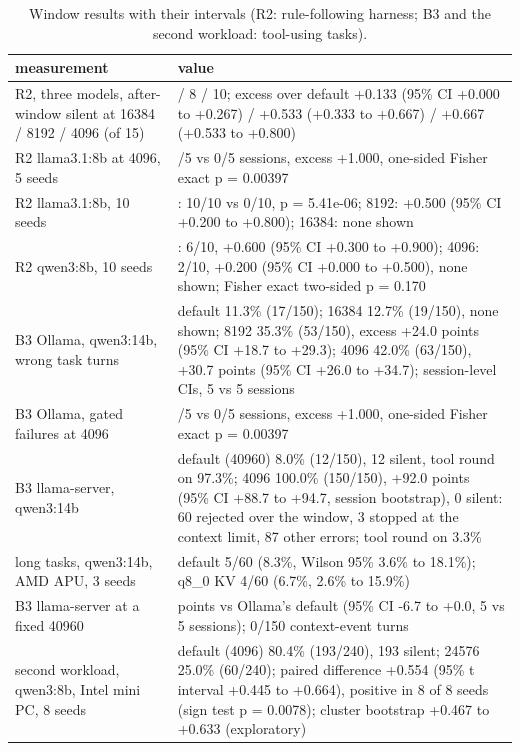\documentclass[conference,10pt]{IEEEtran}
\begin{document}
\begin{table}[t]
\caption{Window results with their intervals (R2: rule-following harness; B3 and the second workload: tool-using tasks).}
\label{tab:window}
\centering\footnotesize
\begin{tabular}{@{}>{\raggedright\arraybackslash}p{}>{\raggedright\arraybackslash}p{}@{}}
\toprule
measurement & value \\
\midrule
R2, three models, after-window silent at 16384 / 8192 / 4096 (of 15) & 2 / 8 / 10; excess over default +0.133 (95\% CI +0.000 to +0.267) / +0.533 (+0.333 to +0.667) / +0.667 (+0.533 to +0.800)  \\
R2 llama3.1:8b at 4096, 5 seeds & 5/5 vs 0/5 sessions, excess +1.000, one-sided Fisher exact p = 0.00397  \\
R2 llama3.1:8b, 10 seeds & 4096: 10/10 vs 0/10, p = 5.41e-06; 8192: +0.500 (95\% CI +0.200 to +0.800); 16384: none shown  \\
R2 qwen3:8b, 10 seeds & 8192: 6/10, +0.600 (95\% CI +0.300 to +0.900); 4096: 2/10, +0.200 (95\% CI +0.000 to +0.500), none shown; Fisher exact two-sided p = 0.170  \\
B3 Ollama, qwen3:14b, wrong task turns & default 11.3\% (17/150); 16384 12.7\% (19/150), none shown; 8192 35.3\% (53/150), excess +24.0 points (95\% CI +18.7 to +29.3); 4096 42.0\% (63/150), +30.7 points (95\% CI +26.0 to +34.7); session-level CIs, 5 vs 5 sessions  \\
B3 Ollama, gated failures at 4096 & 5/5 vs 0/5 sessions, excess +1.000, one-sided Fisher exact p = 0.00397  \\
B3 llama-server, qwen3:14b & default (40960) 8.0\% (12/150), 12 silent, tool round on 97.3\%; 4096 100.0\% (150/150), +92.0 points (95\% CI +88.7 to +94.7, session bootstrap), 0 silent: 60 rejected over the window, 3 stopped at the context limit, 87 other errors; tool round on 3.3\%  \\
long tasks, qwen3:14b, AMD APU, 3 seeds & default 5/60 (8.3\%, Wilson 95\% 3.6\% to 18.1\%); q8\_0 KV 4/60 (6.7\%, 2.6\% to 15.9\%)  \\
B3 llama-server at a fixed 40960 & -3.3 points vs Ollama's default (95\% CI -6.7 to +0.0, 5 vs 5 sessions); 0/150 context-event turns  \\
second workload, qwen3:8b, Intel mini PC, 8 seeds & default (4096) 80.4\% (193/240), 193 silent; 24576 25.0\% (60/240); paired difference +0.554 (95\% t interval +0.445 to +0.664), positive in 8 of 8 seeds (sign test p = 0.0078); cluster bootstrap +0.467 to +0.633 (exploratory)  \\
\bottomrule
\end{tabular}
\end{table}
\end{document}
